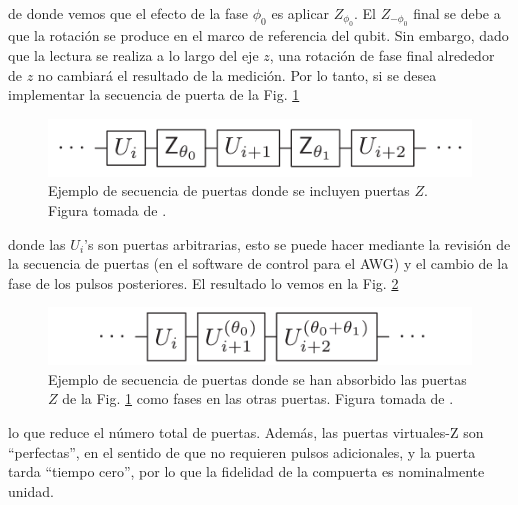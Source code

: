    de donde vemos que el efecto de la fase $\phi_0$ es aplicar $Z_{\phi_0}$. El $Z_{-\phi_0}$ final se debe a que la rotación se produce en el marco de referencia del qubit. Sin embargo, dado que la lectura se realiza a lo largo del eje $z$, una rotación de fase final alrededor de $z$ no cambiará el resultado de la medición. Por lo tanto, si se desea implementar la secuencia de puerta de la Fig. \ref{Fig_scq_vZ_gate_sequence_1}
    \begin{figure}[h!]
        \centering 
        \includegraphics[width=0.5\linewidth]{Figuras/Fig_scq_vZ_gate_sequence_1.png}
        \caption{Ejemplo de secuencia de puertas donde se incluyen puertas $Z$. Figura tomada de  \cite{bib_sqc_superinductor_paper}.}
        \label{Fig_scq_vZ_gate_sequence_1}
    \end{figure}
    donde las $U_i$'s son puertas arbitrarias, esto se puede hacer mediante la revisión de la secuencia de puertas (en el software de control para el AWG) y el cambio de la fase de los pulsos posteriores. El resultado lo vemos en la Fig. \ref{Fig_scq_vZ_gate_sequence_2}
    \begin{figure}[h!]
        \centering 
        \includegraphics[width=0.5\linewidth]{Figuras/Fig_scq_vZ_gate_sequence_2.png}
        \caption{Ejemplo de secuencia de puertas donde se han absorbido las puertas $Z$ de la Fig. \ref{Fig_scq_vZ_gate_sequence_1} como fases en las otras puertas. Figura tomada de  \cite{bib_sqc_superinductor_paper}.}
        \label{Fig_scq_vZ_gate_sequence_2}
    \end{figure}
    
    lo que reduce el número total de puertas. Además, las puertas virtuales-Z son ``perfectas'', en el sentido de que no requieren pulsos adicionales, y la puerta tarda ``tiempo cero'', por lo que la fidelidad de la compuerta es nominalmente unidad.

